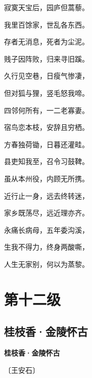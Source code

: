 \documentclass[12pt,UTF-8,openany,fontset=none]{ctexbook}
\begin{document}
\begin{center}
    \begin{Large}

        寂寞天宝后，园庐但蒿藜。

        我里百馀家，世乱各东西。

        存者无消息，死者为尘泥。

        贱子因阵败，归来寻旧蹊。

        久行见空巷，日瘦气惨凄，

        但对狐与狸，竖毛怒我啼。

        四邻何所有，一二老寡妻。

        宿鸟恋本枝，安辞且穷栖。

        方春独荷锄，日暮还灌畦。

        县吏知我至，召令习鼓鞞。

        虽从本州役，内顾无所携。

        近行止一身，远去终转迷，

        家乡既荡尽，远近理亦齐。

        永痛长病母，五年委沟溪，

        生我不得力，终身两酸嘶，

        人生无家别，何以为蒸黎。

    \end{Large}

\end{center}

\vspace{8pt}
\clearpage

\chapter{第十二级}
\clearpage

\section{桂枝香·金陵怀古}


\begin{center}
    {\bfseries 桂枝香·金陵怀古}

    \vspace{18pt}

    \begin{large}\xuwen
        〔王安石〕
    \end{large}

\end{center}
\end{document}
